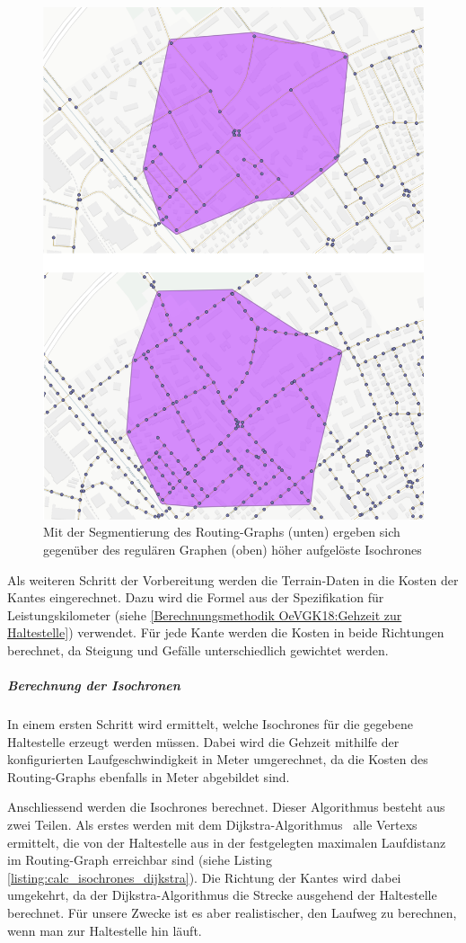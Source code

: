 \begin{figure}[ht]
    \centering
    \includegraphics[width=0.5\linewidth]{projectdoc/img/vergleich_segmentierung}
    \caption[Vergleich von Isochronen bei regulärem und segmentiertem Routing-Graph]{Mit der Segmentierung des \glspl{Routing-Graph} (unten) ergeben sich gegenüber des regulären Graphen (oben) höher aufgelöste \glspl{Isochrone}}
    \label{fig:vergleich_segmentierung}
\end{figure}

Als weiteren Schritt der Vorbereitung werden die Terrain-Daten in die Kosten der \glspl{Kante} eingerechnet.
Dazu wird die Formel aus der Spezifikation für \gls{Leistungskilometer} (siehe \ref{Berechnungsmethodik OeVGK18:Gehzeit zur Haltestelle}) verwendet.
Für jede \gls{Kante} werden die Kosten in beide Richtungen berechnet, da Steigung und Gefälle unterschiedlich gewichtet werden.

\subparagraph{Berechnung der Isochronen}
In einem ersten Schritt wird ermittelt, welche \glspl{Isochrone} für die gegebene \gls{Haltestelle} erzeugt werden müssen.
Dabei wird die Gehzeit mithilfe der konfigurierten Laufgeschwindigkeit in Meter umgerechnet, da die Kosten des \glspl{Routing-Graph} ebenfalls in Meter abgebildet sind.

Anschliessend werden die \glspl{Isochrone} berechnet.
Dieser Algorithmus besteht aus zwei Teilen.
Als erstes werden mit dem \gls{Dijkstra-Algorithmus}~\cite{dijkstra_algorithm} alle \glspl{Vertex} ermittelt, die von der \gls{Haltestelle} aus in der festgelegten maximalen Laufdistanz im \gls{Routing-Graph} erreichbar sind (siehe Listing \ref{listing:calc_isochrones_dijkstra}).
Die Richtung der \glspl{Kante} wird dabei umgekehrt, da der \gls{Dijkstra-Algorithmus} die Strecke ausgehend der \gls{Haltestelle} berechnet.
Für unsere Zwecke ist es aber realistischer, den Laufweg zu berechnen, wenn man zur \gls{Haltestelle} hin läuft.

